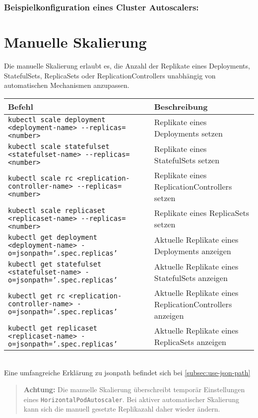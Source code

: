 \subsubsection{Beispielkonfiguration eines Cluster Autoscalers:}


\section{Manuelle Skalierung}
Die manuelle Skalierung erlaubt es, die Anzahl der Replikate eines Deployments, StatefulSets, ReplicaSets oder ReplicationControllers unabhängig von automatischen Mechanismen anzupassen.\\

\noindent
\begin{tabular}{|p{}|p{}|}
\hline
\textbf{Befehl} & \textbf{Beschreibung} \\
\hline
\texttt{kubectl scale deployment <deployment-name> {-}{-}replicas=<number>} & Replikate eines Deployments setzen \\
\texttt{kubectl scale statefulset <statefulset-name> {-}{-}replicas=<number>} & Replikate eines StatefulSets setzen \\
\texttt{kubectl scale rc <replication-controller-name> {-}{-}replicas=<number>} & Replikate eines ReplicationControllers setzen \\
\texttt{kubectl scale replicaset <replicaset-name> {-}{-}replicas=<number>} & Replikate eines ReplicaSets setzen \\
\texttt{kubectl get deployment <deployment-name> -o=jsonpath='{.spec.replicas}'} & Aktuelle Replikate eines Deployments anzeigen \\
\texttt{kubectl get statefulset <statefulset-name> -o=jsonpath='{.spec.replicas}'} & Aktuelle Replikate eines StatefulSets anzeigen \\
\texttt{kubectl get rc <replication-controller-name> -o=jsonpath='{.spec.replicas}'} & Aktuelle Replikate eines ReplicationControllers anzeigen \\
\texttt{kubectl get replicaset <replicaset-name> -o=jsonpath='{.spec.replicas}'} & Aktuelle Replikate eines ReplicaSets anzeigen  \\
\hline
\end{tabular}
\phantom{.}\\
Eine umfangreiche Erklärung zu jsonpath befindet sich bei \ref{subsec:use-json-path}

\begin{quote}
\textbf{Achtung:} Die manuelle Skalierung überschreibt temporär Einstellungen eines \texttt{HorizontalPodAutoscaler}. Bei aktiver automatischer Skalierung kann sich die manuell gesetzte Replikazahl daher wieder ändern.
\end{quote}

